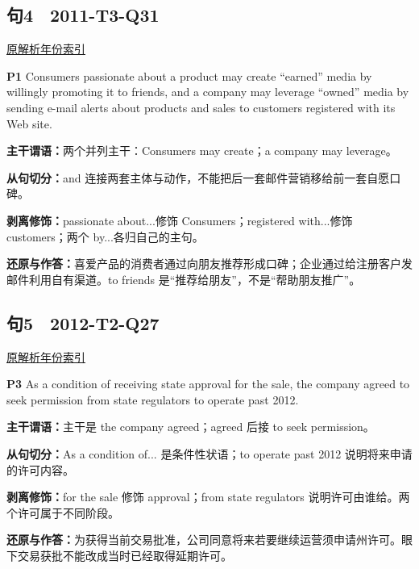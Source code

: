 \documentclass[11pt,a4paper]{article}
\begin{document}
\subsection{句4　2011-T3-Q31}
\noindent \href{https://zj139.github.io/math-notes/english/f805d4b3fde383fcf2cf2e5c/\#q31}{原解析}\quad \hyperref[idx-2011-T3-Q31]{年份索引}
\begin{evidence}\textbf{P1} Consumers passionate about a product may create “earned” media by willingly promoting it to friends, and a company may leverage “owned” media by sending e-mail alerts about products and sales to customers registered with its Web site.\end{evidence}
\noindent\textbf{主干谓语：}两个并列主干：Consumers may create；a company may leverage。\par
\noindent\textbf{从句切分：}and 连接两套主体与动作，不能把后一套邮件营销移给前一套自愿口碑。\par
\noindent\textbf{剥离修饰：}passionate about...修饰 Consumers；registered with...修饰 customers；两个 by...各归自己的主句。\par
\noindent\textbf{还原与作答：}喜爱产品的消费者通过向朋友推荐形成口碑；企业通过给注册客户发邮件利用自有渠道。to friends 是“推荐给朋友”，不是“帮助朋友推广”。\par
{}
\subsection{句5　2012-T2-Q27}
\noindent \href{https://zj139.github.io/math-notes/english/a4585bde3b2a6d949145bd53/\#q27}{原解析}\quad \hyperref[idx-2012-T2-Q27]{年份索引}
\begin{evidence}\textbf{P3} As a condition of receiving state approval for the sale, the company agreed to seek permission from state regulators to operate past 2012.\end{evidence}
\noindent\textbf{主干谓语：}主干是 the company agreed；agreed 后接 to seek permission。\par
\noindent\textbf{从句切分：}As a condition of... 是条件性状语；to operate past 2012 说明将来申请的许可内容。\par
\noindent\textbf{剥离修饰：}for the sale 修饰 approval；from state regulators 说明许可由谁给。两个许可属于不同阶段。\par
\noindent\textbf{还原与作答：}为获得当前交易批准，公司同意将来若要继续运营须申请州许可。眼下交易获批不能改成当时已经取得延期许可。\par
{}
\end{document}
